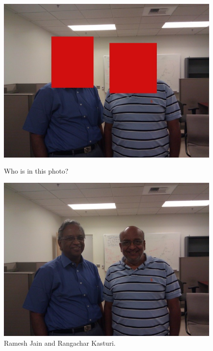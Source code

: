 \begin{figure}[ht]
\begin{minipage}[b]{0.45\linewidth}
\centering
\includegraphics[width=\textwidth]{media/chapter1/kasturi-hidden.jpg}
\caption{Who is in this photo?}
\label{fig:example-icmr-hidden}
\end{minipage}
\hspace{0.5cm}
\begin{minipage}[b]{0.45\linewidth}
\centering
\includegraphics[width=\textwidth]{media/chapter1/kasturi-show.jpg}
\caption{Ramesh Jain and Rangachar Kasturi.}
\label{fig:example-icmr-show}
\end{minipage}
\end{figure}

